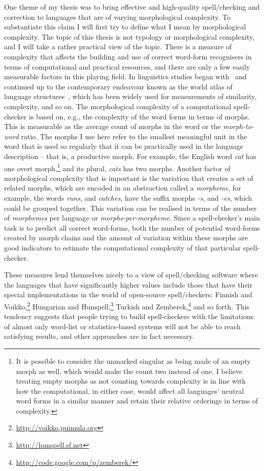 \documentclass[officiallayout,final]{unihelcompling}
\begin{document}
One theme of my thesis was to bring effective and high-quality
spell\-/checking and correction to languages that are of varying
\gls{morphological complexity}.  To substantiate this claim I will first try to
define what I mean by morphological complexity.  The topic of this thesis is
not typology or morphological complexity, and I will take a rather practical
view of the topic.  There is a measure of complexity that affects the building
and use of correct word-form recognisers in terms of computational and
practical resources, and there are only a few easily measurable factors in this
playing field. In linguistics studies began with~\citet{greenberg1960quantitative} and continued up to the contemporary endeavour
known as the world atlas of language structures~\citep{wals}, which has been widely
used for measurements of similarity, complexity, and so on.  The morphological
complexity of a computational spell-checker is based on, e.g., the complexity
of the word forms in terms of \glspl{morph}.  This is measurable as the average
count of morphs in the word or the \emph{morph-to-word} ratio. The morphs I use
here refer to the smallest meaningful unit in the word that is used so
regularly that it can be practically used in the language description -- that
is, a productive morph. For example, the English word \emph{cat} has one overt
morph,\footnote{It is possible to consider the unmarked singular as being made
    of an empty morph as well, which would make the count two instead of one. I
    believe treating empty morphs as not counting towards complexity is in line
    with how the computational, in either case, would affect all languages'
neutral word forms in a similar manner and retain their relative orderings in
terms of complexity.} and its plural, \emph{cats} has two morphs.  Another
factor of morphological complexity that is important is the variation that
creates a set of related morphs, which are encoded in an abstraction called a
\emph{morpheme}, for example, the words \emph{runs}, and \emph{catches}, have the
suffix morphs \emph{-s}, and \emph{-es}, which could be grouped together. This
variation can be realised in terms of the number of \emph{morphemes} per
language or \emph{morphs-per-morpheme}. Since a spell-checker's main task is to
predict all correct word-forms, both the number of potential word-forms created
by morph chains and the amount of variation within these morphs are good
indicators to estimate the computational complexity of that particular
spell-checker.

These measures lend themselves nicely to a view of spell\-/checking
software where the languages that have significantly higher values 
include those that have their special implementations in the
world of open-source spell\-/checkers: Finnish and
Voikko,\footnote{\url{http://voikko.puimula.org}} Hungarian and
Hunspell,\footnote{\url{http://hunspell.sf.net}} Turkish and
Zemberek,\footnote{\url{http://code.google.com/p/zemberek/}} and so forth.
This tendency suggests that people trying to build spell-checkers with the
limitations of almost only word-list or statistics-based systems will not be
able to reach satisfying results, and other approaches are in fact necessary.
\end{document}
